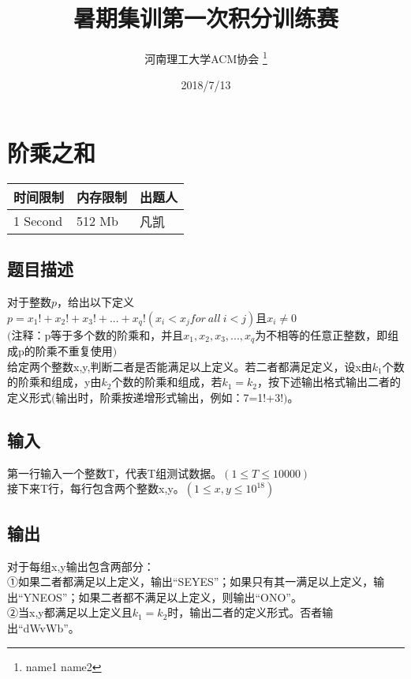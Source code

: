 \documentclass[12pt, a4paper]{article}
\title{暑期集训第一次积分训练赛}
\author{河南理工大学ACM协会 \thanks{name1 name2}}
\date{2018/7/13}
\begin{document}
\maketitle\newpage


\section{阶乘之和}

\begin{table}[!h]
  \centering
  \begin{tabular}{l|l|l}
  时间限制 & 内存限制 & 出题人 \\
  \hline
  1 Second & 512 Mb & 凡凯 \\
\end{tabular}
\end{table}

\subsection*{题目描述}

对于整数$p$，给出以下定义\\
$p=x_{1}!+x_{2}!+x_{3}!+...+x_{q}!(x_{i}<x_{j}for\ all\ i<j )$且$x_{i} \neq 0$\\
$($注释：p等于多个数的阶乘和，并且$x_{1},x_{2},x_{3},...,x_{q}$为不相等的任意正整数，即组成p的阶乘不重复使用$)$\\
给定两个整数x,y,判断二者是否能满足以上定义。若二者都满足定义，设x由$k_{1}$个数的阶乘和组成，y由$k_{2}$个数的阶乘和组成，若$k_{1}=k_{2}$，按下述输出格式输出二者的定义形式$($输出时，阶乘按递增形式输出，例如：7=1!+3!$)$。

\subsection*{输入}

第一行输入一个整数T，代表T组测试数据。$(1\leq T \leq 10000)$\\
接下来T行，每行包含两个整数x,y。$(1\leq x,y \leq 10^{18})$\\

\subsection*{输出}
对于每组x,y输出包含两部分：\\
①如果二者都满足以上定义，输出“SEYES”；如果只有其一满足以上定义，输出“YNEOS”；如果二者都不满足以上定义，则输出“ONO”。\\
②当x,y都满足以上定义且$k_{1}=k_{2}$时，输出二者的定义形式。否者输出“dWvWb”。
\end{document}
